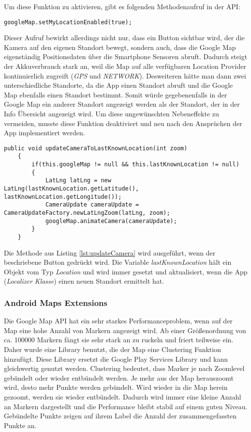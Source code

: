 Um diese Funktion zu aktivieren, gibt es folgenden Methodenaufruf in der API: 

\begin{lstlisting}[caption={},label=lst:setMyLocationEnabled]
	googleMap.setMyLocationEnabled(true);
\end{lstlisting}

Dieser Aufruf bewirkt allerdings nicht nur, dass ein Button sichtbar wird, der die Kamera auf den eigenen Standort bewegt, sondern auch, dass die Google Map eigenständig Positionsdaten über die Smartphone Sensoren abruft. Dadurch steigt der Akkuverbrauch stark an, weil die Map auf alle verfügbaren Location Provider kontinuierlich zugreift (\textit{GPS} und \textit{NETWORK}). Desweiteren hätte man dann zwei unterschiedliche Standorte, da die App einen Standort abruft und die Google Map ebenfalls einen Standort bestimmt. Somit würde gegebenenfalls in der Google Map ein anderer Standort angezeigt werden als der Standort, der in der Info Übersicht angezeigt wird. Um diese ungewünschten Nebeneffekte zu vermeiden, musste diese Funktion deaktiviert und neu nach den Ansprüchen der App implementiert werden.

\begin{lstlisting}[caption={"Kamera auf letzte bekannte Position setzen"},label=lst:updateCamera]
	public void updateCameraToLastKnownLocation(int zoom)
	{
		if(this.googleMap != null && this.lastKnownLocation != null)
		{
			LatLng latLng = new LatLng(lastKnownLocation.getLatitude(), 					lastKnownLocation.getLongitude());
		    CameraUpdate cameraUpdate = CameraUpdateFactory.newLatLngZoom(latLng, zoom);
		    googleMap.animateCamera(cameraUpdate);
		}
	}
\end{lstlisting}

Die Methode aus Listing \ref{lst:updateCamera} wird ausgeführt, wenn der beschriebene Button gedrückt wird. Die Variable \textit{lastKnownLocation} hält ein Objekt vom Typ \textit{Location} und wird immer gesetzt und aktualisiert, wenn die App (\textit{Localizer Klasse}) einen neuen Standort ermittelt hat. 

\subsubsection{Android Maps Extensions}

Die Google Map API hat ein sehr starkes Performanceproblem, wenn auf der Map eine hohe Anzahl von Markern angezeigt wird. Ab einer Größenordnung von ca. 100000 Markern fängt sie sehr stark an zu ruckeln und friert teilweise ein. Daher wurde eine Library benutzt, die der Map eine Clustering Funktion hinzufügt. Diese Library ersetzt die Google Play Services Library und kann gleichwertig genutzt werden. Clustering bedeutet, dass Marker je nach Zoomlevel gebündelt oder wieder entbündelt werden. Je mehr aus der Map herauszoomt wird, desto mehr Punkte werden gebündelt. Wird wieder in die Map herein gezoomt, werden sie wieder entbündelt. Dadurch wird immer eine kleine Anzahl an Markern dargestellt und die Performance bleibt stabil auf einem guten Niveau. Gebündelte Punkte zeigen auf ihrem Label die Anzahl der zusammengefassten Punkte an.

